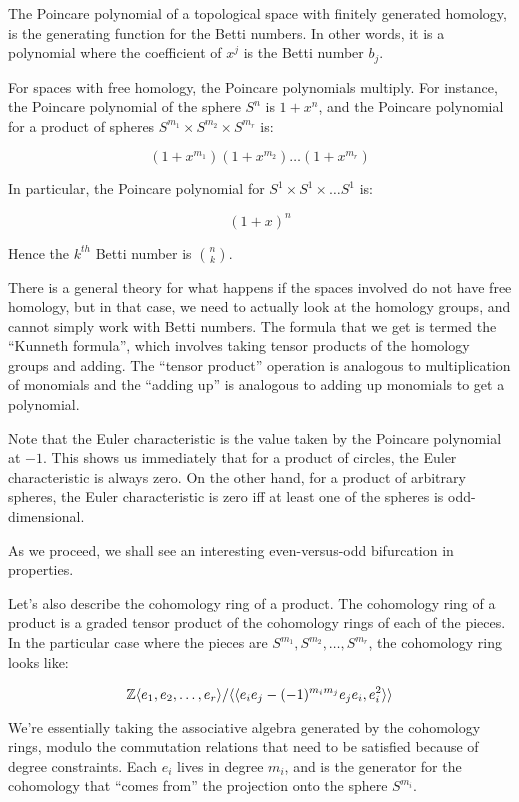 \documentclass[a4paper]{amsart}
\begin{document}
\begin{definer}
  The Poincare polynomial of a topological space with finitely
  generated homology, is the generating function for the Betti
  numbers.  In other words, it is a polynomial where the coefficient
  of $x^j$ is the Betti number $b_j$.
\end{definer}

For spaces with free homology, the Poincare polynomials multiply.  For
instance, the Poincare polynomial of the sphere $S^n$ is $1 + x^n$,
and the Poincare polynomial for a product of spheres $S^{m_1} \times
S^{m_2} \times S^{m_r}$ is:

$$(1 + x^{m_1})(1 + x^{m_2}) \ldots (1 + x^{m_r})$$

In particular, the Poincare polynomial for $S^1 \times S^1 \times \ldots S^1$
is:

$$(1 + x)^n$$

Hence the $k^{th}$ Betti number is $\binom{n}{k}$.

There is a general theory for what happens if the spaces involved do
not have free homology, but in that case, we need to actually look at
the homology groups, and cannot simply work with Betti numbers. The
formula that we get is termed the ``Kunneth formula'', which involves
taking tensor products of the homology groups and adding. The ``tensor
product'' operation is analogous to multiplication of monomials and
the ``adding up'' is analogous to adding up monomials to get a
polynomial.

Note that the Euler characteristic is the value taken by the Poincare
polynomial at $-1$. This shows us immediately that for a product of
circles, the Euler characteristic is always zero. On the other hand,
for a product of arbitrary spheres, the Euler characteristic is zero
iff at least one of the spheres is odd-dimensional.

As we proceed, we shall see an interesting even-versus-odd bifurcation
in properties.

Let's also describe the cohomology ring of a product. The cohomology
ring of a product is a graded tensor product of the cohomology rings
of each of the pieces. In the particular case where the pieces are $S^{m_1},S^{m_2},\ldots,S^{m_r}$, the cohomology ring looks like:

$$\mathbb{Z}\langle e_1,e_2,\ldots,e_r\rangle/\langle \langle e_ie_j - (-1)^{m_im_j}e_je_i, e_i^2 \rangle \rangle$$

We're essentially taking the associative algebra generated by the
cohomology rings, modulo the commutation relations that need to be
satisfied because of degree constraints. Each $e_i$ lives in degree $m_i$,
and is the generator for the cohomology that ``comes from'' the projection
onto the sphere $S^{m_i}$.
\end{document}
